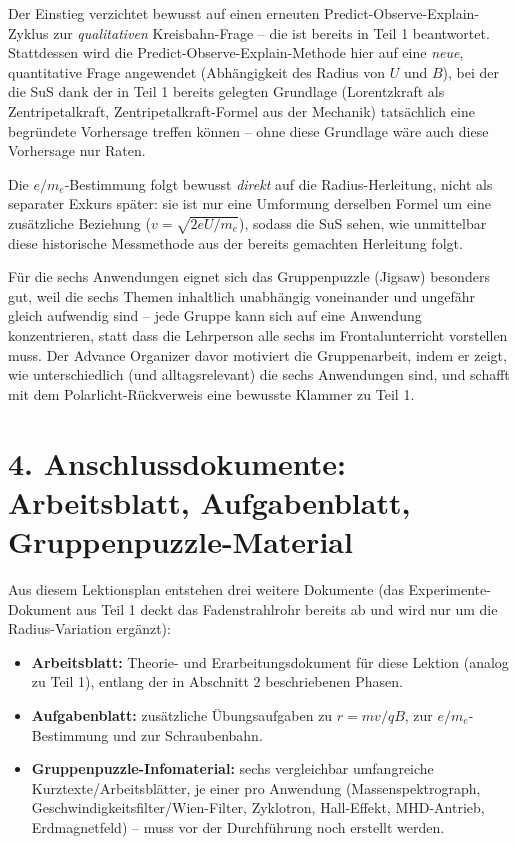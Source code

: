 \documentclass[11pt,a4paper]{article}
\begin{document}
Der Einstieg verzichtet bewusst auf einen erneuten
Predict-Observe-Explain-Zyklus zur \emph{qualitativen} Kreisbahn-Frage --
die ist bereits in Teil 1 beantwortet. Stattdessen wird die
Predict-Observe-Explain-Methode hier auf eine \emph{neue}, quantitative
Frage angewendet (Abhängigkeit des Radius von $U$ und $B$), bei der die
SuS dank der in Teil 1 bereits gelegten Grundlage (Lorentzkraft als
Zentripetalkraft, Zentripetalkraft-Formel aus der Mechanik) tatsächlich
eine begründete Vorhersage treffen können -- ohne diese Grundlage wäre
auch diese Vorhersage nur Raten.

Die $e/m_e$-Bestimmung folgt bewusst \emph{direkt} auf die
Radius-Herleitung, nicht als separater Exkurs später: sie ist nur eine
Umformung derselben Formel um eine zusätzliche Beziehung
($v=\sqrt{2eU/m_e}$), sodass die SuS sehen, wie unmittelbar diese
historische Messmethode aus der bereits gemachten Herleitung folgt.

Für die sechs Anwendungen eignet sich das Gruppenpuzzle (Jigsaw)
besonders gut, weil die sechs Themen inhaltlich unabhängig voneinander
und ungefähr gleich aufwendig sind -- jede Gruppe kann sich auf eine
Anwendung konzentrieren, statt dass die Lehrperson alle sechs im
Frontalunterricht vorstellen muss. Der Advance Organizer davor motiviert
die Gruppenarbeit, indem er zeigt, wie unterschiedlich (und
alltagsrelevant) die sechs Anwendungen sind, und schafft mit dem
Polarlicht-Rückverweis eine bewusste Klammer zu Teil 1.

\section*{4. Anschlussdokumente: Arbeitsblatt, Aufgabenblatt, Gruppenpuzzle-Material}

Aus diesem Lektionsplan entstehen drei weitere Dokumente (das
Experimente-Dokument aus Teil 1 deckt das Fadenstrahlrohr bereits ab und
wird nur um die Radius-Variation ergänzt):

\begin{itemize}[leftmargin=1.2cm,itemsep=0.4em]
  \item \textbf{Arbeitsblatt:} Theorie- und Erarbeitungsdokument für
  diese Lektion (analog zu Teil 1), entlang der in Abschnitt 2
  beschriebenen Phasen.
  \item \textbf{Aufgabenblatt:} zusätzliche Übungsaufgaben zu $r=mv/qB$,
  zur $e/m_e$-Bestimmung und zur Schraubenbahn.
  \item \textbf{Gruppenpuzzle-Infomaterial:} sechs vergleichbar
  umfangreiche Kurztexte/Arbeitsblätter, je einer pro Anwendung
  (Massenspektrograph, Geschwindigkeitsfilter/Wien-Filter, Zyklotron,
  Hall-Effekt, MHD-Antrieb, Erdmagnetfeld) -- muss vor der Durchführung
  noch erstellt werden.
\end{itemize}
\end{document}
